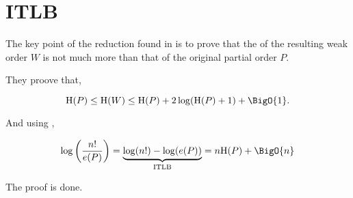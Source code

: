 \section{ITLB}
\label{tree:pop:itlb}

The key point of the reduction found in \cite{jcardin1} is to prove that the  of the resulting weak order $W$ is not much more than that of the original partial order $P$.

They proove that,

\begin{equation}
\text{H}(P) \leq \text{H}(W) \leq \text{H}(P) + 2 \log(\text{H}(P) + 1) + \BigO{1}.
\label{eq:jcardin1}
\end{equation}


And using \cite{kahnkim1},

\begin{equation}
\log\left(\frac{n!}{e(P)}\right) = \underbrace{\log(n!) - \log(e(P))}_\text{ITLB} = n \text{H}(P) + \BigO{n}
\label{eq:khankim1}
\end{equation}

The proof is done.
